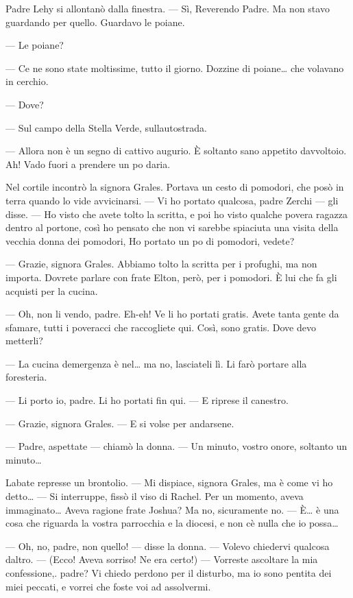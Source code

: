 Padre Lehy si allontanò dalla finestra. --- Sì, Reverendo Padre. Ma non
stavo guardando per quello. Guardavo le poiane.

--- Le poiane?

--- Ce ne sono state moltissime, tutto il giorno. Dozzine di
poiane\ldots{} che volavano in cerchio.

--- Dove?

--- Sul campo della Stella Verde, sull\textquotesingle autostrada.

--- Allora non è un segno di cattivo augurio. È soltanto sano appetito
d\textquotesingle avvoltoio. Ah! Vado fuori a prendere un
po\textquotesingle{} d\textquotesingle aria.

Nel cortile incontrò la signora Grales. Portava un cesto di pomodori,
che posò in terra quando lo vide avvicinarsi. --- Vi ho portato
qualcosa, padre Zerchi --- gli disse. --- Ho visto che avete tolto la
scritta, e poi ho visto qualche povera ragazza dentro al portone, così
ho pensato che non vi sarebbe spiaciuta una visita della vecchia donna
dei pomodori, Ho portato un po\textquotesingle{} di pomodori, vedete?

--- Grazie, signora Grales. Abbiamo tolto la scritta per i profughi, ma
non importa. Dovrete parlare con frate Elton, però, per i pomodori. È
lui che fa gli acquisti per la cucina.

--- Oh, non li vendo, padre. Eh-eh! Ve li ho portati gratis. Avete tanta
gente da sfamare, tutti i poveracci che raccogliete qui. Così, sono
gratis. Dove devo metterli?

--- La cucina d\textquotesingle emergenza è nel\ldots{} ma no,
lasciateli lì. Li farò portare alla foresteria.

--- Li porto io, padre. Li ho portati fin qui. --- E riprese il
canestro.

--- Grazie, signora Grales. --- E si volse per andarsene.

--- Padre, aspettate --- chiamò la donna. --- Un minuto, vostro onore,
soltanto un minuto\ldots{}

L\textquotesingle abate represse un brontolio. --- Mi dispiace, signora
Grales, ma è come vi ho detto\ldots{} --- Si interruppe, fissò il viso
di Rachel. Per un momento, aveva immaginato\ldots{} Aveva ragione frate
Joshua? Ma no, sicuramente no. --- È\ldots{} è una cosa che riguarda la
vostra parrocchia e la diocesi, e non c\textquotesingle è nulla che io
possa\ldots{}

--- Oh, no, padre, non quello! --- disse la donna. --- Volevo chiedervi
qualcosa d\textquotesingle altro. --- (Ecco! Aveva sorriso! Ne era
certo!) --- Vorreste ascoltare la mia confessione,. padre? Vi chiedo
perdono per il disturbo, ma io sono pentita dei miei peccati, e vorrei
che foste voi ad assolvermi.

